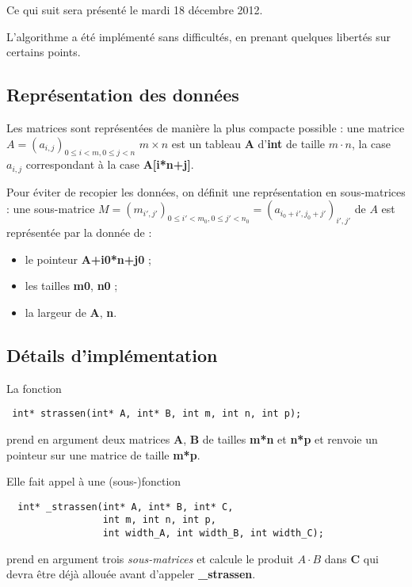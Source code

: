 \documentclass[a4paper]{article}
\begin{document}
Ce qui suit sera présenté le mardi 18 décembre 2012.

L'algorithme a été implémenté sans difficultés, en prenant quelques
libertés sur certains points.

\subsection{Représentation des données}

Les matrices sont représentées de manière la plus compacte possible :
une matrice $A=(a_{i,j})_{0 \leq i < m, 0 \leq j < n}$ $m \times n$ est
un tableau {\bf A} d'{\bf int} de taille $m \cdot n$,
la case $a_{i,j}$ correspondant à la case {\bf A[i*n+j]}.

Pour éviter de recopier les données, on définit une représentation en
sous-matrices :
une sous-matrice
$M = (m_{i',j'})_{0 \leq i' < m_0, 0 \leq j' < n_0} =
(a_{i_0+i',j_0+j'})_{i',j'}$
de $A$ est représentée par la donnée de :

\begin{itemize}
  \item le pointeur {\bf A+i0*n+j0} ;
  \item les tailles {\bf m0}, {\bf n0} ;
  \item la largeur de {\bf A}, {\bf n}.
\end{itemize}

\subsection{Détails d'implémentation}

La fonction

\begin{verbatim}
 int* strassen(int* A, int* B, int m, int n, int p);
\end{verbatim}

prend en argument deux matrices {\bf A}, {\bf B} de tailles {\bf m*n} et
{\bf n*p} et renvoie un pointeur sur une matrice de taille {\bf m*p}.

Elle fait appel à une (sous-)fonction

\begin{verbatim}
  int* _strassen(int* A, int* B, int* C,
                 int m, int n, int p,
                 int width_A, int width_B, int width_C);
\end{verbatim}

prend en argument trois {\it sous-matrices} et calcule le produit
$A \cdot B$ dans {\bf C} qui devra être déjà allouée avant d'appeler
{\bf \_strassen}.
\end{document}
